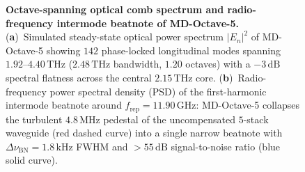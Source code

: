 \documentclass[11pt,letterpaper]{article}
\begin{document}
\begin{table}[t!]
\centering
\caption{Structural, spectral, and frequency-comb locking parameters for the $3$-stack benchmark~\cite{Garrasi2019}, the uncompensated $5$-stack Jaidl--Unterrainer cascade~\cite{Jaidl2021,JaidlUnterrainerRoadmap2025}, and our micro-disk-compensated design MD-Octave-5.}
\vspace{6pt}
\label{tab:real_comb_devices}
\end{table}

\begin{figure}[t!]
\centering
\resizebox{0.97\textwidth}{!}{}
\caption{\textbf{Octave-spanning optical comb spectrum and radio-frequency intermode beatnote of MD-Octave-5.} (\textbf{a})~Simulated steady-state optical power spectrum $|E_n|^2$ of MD-Octave-5 showing $142$ phase-locked longitudinal modes spanning $1.92\text{--}4.40\,\mathrm{THz}$ ($2.48\,\mathrm{THz}$ bandwidth, $1.20$ octaves) with a $-3\,\mathrm{dB}$ spectral flatness across the central $2.15\,\mathrm{THz}$ core. (\textbf{b})~Radio-frequency power spectral density (PSD) of the first-harmonic intermode beatnote around $f_{\mathrm{rep}} = 11.90\,\mathrm{GHz}$: MD-Octave-5 collapses the turbulent $4.8\,\mathrm{MHz}$ pedestal of the uncompensated $5$-stack waveguide (red dashed curve) into a single narrow beatnote with $\Delta\nu_{\mathrm{BN}} = 1.8\,\mathrm{kHz}$ FWHM and $>55\,\mathrm{dB}$ signal-to-noise ratio (blue solid curve).}
\label{fig:octave_spectrum}
\end{figure}
\end{document}
